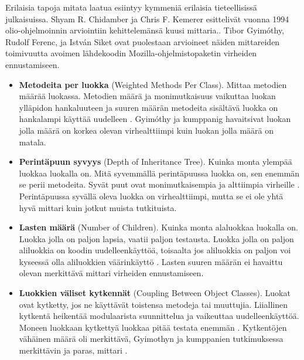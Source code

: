 \documentclass[finnish]{tktltiki2}
\theoremstyle{definition}
\theoremstyle{remark}
\begin{document}
Erilaisia tapoja mitata laatua esiintyy kymmeniä erilaisia tieteellisissä julkaisuissa. Shyam R. Chidamber ja Chris F. Kemerer esittelivät vuonna 1994 olio-ohjelmoinnin arviointiin kehittelemänsä kuusi mittaria.\cite{Chidamber94}. Tibor Gyimóthy, Rudolf Ferenc, ja István Siket ovat puolestaan arvioineet näiden mittareiden toimivuutta avoimen lähdekoodin Mozilla-ohjelmistopaketin virheiden ennustamiseen. \cite{Gyimothy05}


\begin{itemize}

  \item \textbf{Metodeita per luokka} (Weighted Methods Per Class). Mittaa metodien määrää luokassa. Metodien määrä ja monimutkaisuus vaikuttaa luokan ylläpidon hankaluuteen ja suuren määrän metodeita sisältävä luokka on hankalampi käyttää uudelleen \cite{Chidamber94}. Gyimóthy ja kumppanig havaitsivat luokan jolla määrä on korkea olevan virhealttiimpi kuin luokan jolla määrä on matala. \cite{Gyimothy05}

  \item \textbf{Perintäpuun syvyys} (Depth of Inheritance Tree). Kuinka monta ylempää luokkaa luokalla on. Mitä syvemmällä perintäpuussa luokka on, sen enemmän se perii metodeita. Syvät puut ovat monimutkaisempia ja alttiimpia virheille \cite{Chidamber94}. Perintäpuussa syvällä oleva luokka on virhealttiimpi, mutta se ei ole yhtä hyvä mittari kuin jotkut muista tutkituista. \cite{Gyimothy05}

  \item \textbf{Lasten määrä} (Number of Children). Kuinka monta alaluokkaa luokalla on. Luokka jolla on paljon lapsia, vaatii paljon testausta. Luokka jolla on paljon aliluokkia on koodin uudelleenkäyttöä, toisaalta jos aliluokkia on paljon voi kyseessä olla aliluokkien väärinkäyttö \cite{Chidamber94}. Lasten suuren määrän ei havaittu olevan merkittävä mittari virheiden ennustamiseen. \cite{Gyimothy05}

  \item \textbf{Luokkien väliset kytkennät} (Coupling Between Object Classes). Luokat ovat kytketty, jos ne käyttävät toistensa metodeja tai muuttujia. Liiallinen kytkentä heikentää modulaarista suunnittelua ja vaikeuttaa uudelleenkäyttöä. Moneen luokkaan kytkettyä luokkaa pitää testata enemmän \cite{Chidamber94}. Kytkentöjen vähäinen määrä oli merkittävä, Gyimothyn ja kumppanien tutkimuksessa merkittävin ja paras, mittari \cite{Gyimothy05}.


\end{itemize}
\end{document}
